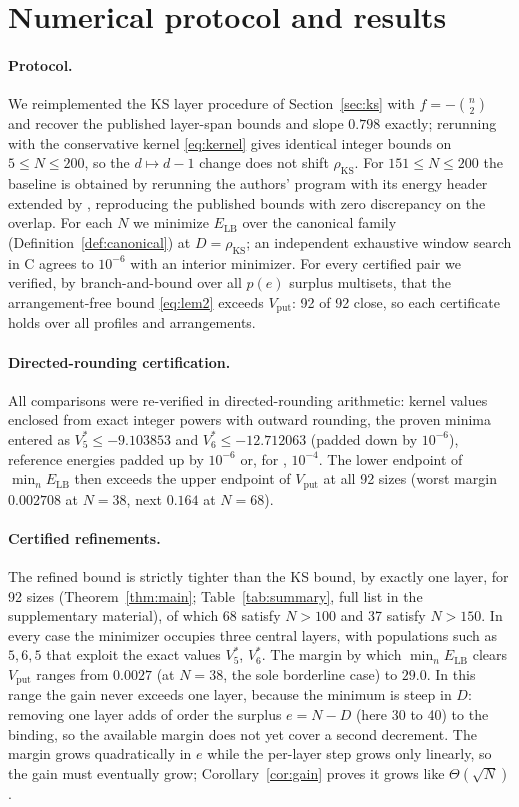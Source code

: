 \documentclass[11pt]{article}
\theoremstyle{remark}
\newcommand{\LB}{\mathrm{LB}}
\newcommand{\KS}{\mathrm{KS}}
\newcommand{\vput}{\mathrm{put}}
\begin{document}
\section{Numerical protocol and results}\label{sec:numerics}

\paragraph{Protocol.}
We reimplemented the KS layer procedure of Section~\ref{sec:ks} with $f=-\binom n2$ and recover the published layer-span bounds and slope $0.798$ exactly; rerunning with the conservative kernel \eqref{eq:kernel} gives identical integer bounds on $5\le N\le200$, so the $d\mapsto d-1$ change does not shift $\rho_\KS$. For $151\le N\le200$ the baseline is obtained by rerunning the authors' program with its energy header extended by \cite{romero1999}, reproducing the published bounds with zero discrepancy on the overlap. For each $N$ we minimize $E_\LB$ over the canonical family (Definition~\ref{def:canonical}) at $D=\rho_\KS$; an independent exhaustive window search in C agrees to $10^{-6}$ with an interior minimizer. For every certified pair we verified, by branch-and-bound over all $p(e)$ surplus multisets, that the arrangement-free bound \eqref{eq:lem2} exceeds $V_\vput$: 92 of 92 close, so each certificate holds over all profiles and arrangements.

\paragraph{Directed-rounding certification.}
All comparisons were re-verified in directed-rounding arithmetic: kernel values enclosed from exact integer powers with outward rounding, the proven minima entered as $V^*_5\le-9.103853$ and $V^*_6\le-12.712063$ (padded down by $10^{-6}$), reference energies padded up by $10^{-6}$ or, for \cite{romero1999}, $10^{-4}$. The lower endpoint of $\min_n E_\LB$ then exceeds the upper endpoint of $V_\vput$ at all 92 sizes (worst margin $0.002708$ at $N=38$, next $0.164$ at $N=68$).

\paragraph{Certified refinements.}
The refined bound is strictly tighter than the KS bound, by exactly one layer, for 92 sizes (Theorem~\ref{thm:main}; Table~\ref{tab:summary}, full list in the supplementary material), of which 68 satisfy $N>100$ and 37 satisfy $N>150$. In every case the minimizer occupies three central layers, with populations such as $5,6,5$ that exploit the exact values $V^*_5$, $V^*_6$. The margin by which $\min_n E_\LB$ clears $V_\vput$ ranges from $0.0027$ (at $N=38$, the sole borderline case) to $29.0$. In this range the gain never exceeds one layer, because the minimum is steep in $D$: removing one layer adds of order the surplus $e=N-D$ (here 30 to 40) to the binding, so the available margin does not yet cover a second decrement. The margin grows quadratically in $e$ while the per-layer step grows only linearly, so the gain must eventually grow; Corollary~\ref{cor:gain} proves it grows like $\Theta(\sqrt N)$.
\end{document}
